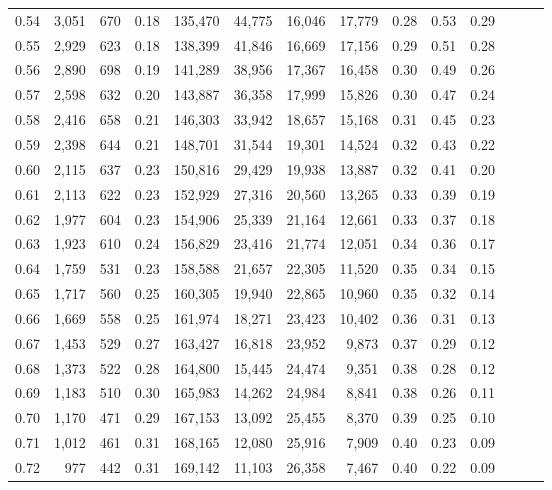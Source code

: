 \begin{tabular}{rrrrrrrrrrrrrr}
0.54 &  3,051 &  670 &  0.18 &  135,470 &   44,775 &  16,046 &  17,779 &  0.28 &  0.53 &      0.29 \\
0.55 &  2,929 &  623 &  0.18 &  138,399 &   41,846 &  16,669 &  17,156 &  0.29 &  0.51 &      0.28 \\
0.56 &  2,890 &  698 &  0.19 &  141,289 &   38,956 &  17,367 &  16,458 &  0.30 &  0.49 &      0.26 \\
0.57 &  2,598 &  632 &  0.20 &  143,887 &   36,358 &  17,999 &  15,826 &  0.30 &  0.47 &      0.24 \\
0.58 &  2,416 &  658 &  0.21 &  146,303 &   33,942 &  18,657 &  15,168 &  0.31 &  0.45 &      0.23 \\
0.59 &  2,398 &  644 &  0.21 &  148,701 &   31,544 &  19,301 &  14,524 &  0.32 &  0.43 &      0.22 \\
0.60 &  2,115 &  637 &  0.23 &  150,816 &   29,429 &  19,938 &  13,887 &  0.32 &  0.41 &      0.20 \\
0.61 &  2,113 &  622 &  0.23 &  152,929 &   27,316 &  20,560 &  13,265 &  0.33 &  0.39 &      0.19 \\
0.62 &  1,977 &  604 &  0.23 &  154,906 &   25,339 &  21,164 &  12,661 &  0.33 &  0.37 &      0.18 \\
0.63 &  1,923 &  610 &  0.24 &  156,829 &   23,416 &  21,774 &  12,051 &  0.34 &  0.36 &      0.17 \\
0.64 &  1,759 &  531 &  0.23 &  158,588 &   21,657 &  22,305 &  11,520 &  0.35 &  0.34 &      0.15 \\
0.65 &  1,717 &  560 &  0.25 &  160,305 &   19,940 &  22,865 &  10,960 &  0.35 &  0.32 &      0.14 \\
0.66 &  1,669 &  558 &  0.25 &  161,974 &   18,271 &  23,423 &  10,402 &  0.36 &  0.31 &      0.13 \\
0.67 &  1,453 &  529 &  0.27 &  163,427 &   16,818 &  23,952 &   9,873 &  0.37 &  0.29 &      0.12 \\
0.68 &  1,373 &  522 &  0.28 &  164,800 &   15,445 &  24,474 &   9,351 &  0.38 &  0.28 &      0.12 \\
0.69 &  1,183 &  510 &  0.30 &  165,983 &   14,262 &  24,984 &   8,841 &  0.38 &  0.26 &      0.11 \\
0.70 &  1,170 &  471 &  0.29 &  167,153 &   13,092 &  25,455 &   8,370 &  0.39 &  0.25 &      0.10 \\
0.71 &  1,012 &  461 &  0.31 &  168,165 &   12,080 &  25,916 &   7,909 &  0.40 &  0.23 &      0.09 \\
0.72 &    977 &  442 &  0.31 &  169,142 &   11,103 &  26,358 &   7,467 &  0.40 &  0.22 &      0.09 \\

\end{tabular}
